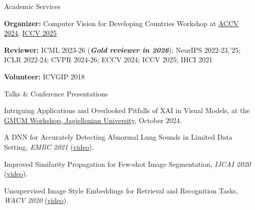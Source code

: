 \documentclass{resume} %
\begin{document}


\begin{rSection}{Academic Services} \itemsep -5pt
\item \textbf{Organizer:} Computer Vision for Developing Countries Workshop at \href{https://cv4dc.github.io/2024/}{ACCV 2024}, \href{https://cv4dc.github.io/2025/}{ICCV 2025}
\item \textbf{Reviewer:} ICML 2023-26 (\textbf{\textit{Gold reviewer in 2026}}); NeurIPS 2022-23,'25; ICLR 2022-24; CVPR 2024-26; ECCV 2024; ICCV 2025; IHCI 2021
\item \textbf{Volunteer:} ICVGIP 2018
\end{rSection}

\vspace{-4pt}
\begin{rSection}{Talks \& Conference Presentations} \itemsep -4pt
\vspace{-4pt}
\begin{small}
\item Intriguing Applications and Overlooked Pitfalls of XAI in Visual Models, at the \href{https://gmum.net/}{GMUM  Workshop, Jagiellonian University}, October 2024.
\item A DNN for Accurately Detecting Abnormal Lung Sounds in Limited Data Setting, \textit{EMBC 2021} (\href{https://youtu.be/XoAF3fCAqq4}{video}).
\item Improved Similarity Propagation for Few-shot Image Segmentation, \textit{IJCAI 2020} (\href{https://www.ijcai.org/proceedings/2020/video/24830}{video}).
\item Unsupervised Image Style Embeddings for Retrieval and Recognition Tasks, \textit{WACV 2020} (\href{https://www.youtube.com/watch?v=EbUOg1gVcFw&t=909s}{video}).
\end{small}

\end{rSection}
\end{document}
